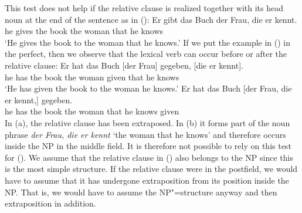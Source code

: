 {\noindent
This test does not help if the relative clause is realized together with its head noun at the end of the sentence as in ():
\ea
\gll Er gibt das Buch der Frau, die er kennt.\\
      he gives the book the woman that he knows\\
\glt `He gives the book to the woman that he knows.'
\z
If we put the example in () in the perfect, then we observe that the lexical verb can occur before or after the relative clause:
\eal
\ex 
\gll Er hat das Buch [der Frau] gegeben, [die er kennt].\\
     he has the book \spacebr{}the woman given \spacebr{}that he knows\\
\glt `He has given the book to the woman he knows.'
\ex 
\gll Er hat das Buch [der Frau, die er kennt,] gegeben.\\
	 he has the book \spacebr{}the woman that he knows given\\
\zl
In (a), the relative clause has been extraposed. In (b) it forms part of the noun phrase \emph{der Frau, die er kennt} `the woman that he knows'
and therefore occurs inside the NP in the middle field. It is therefore not possible to rely on this test for (). We assume that the relative clause in ()
also belongs to the NP since this is the most simple structure. If the relative clause were in the
postfield, we would have to assume that it has undergone extraposition from its position inside
the NP. That is, we would have to assume the NP"=structure anyway and then extraposition in addition.%
%

}
